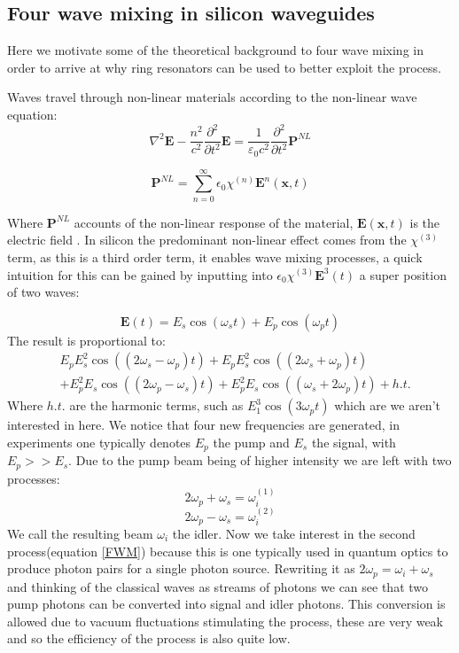 \subsection{Four wave mixing in silicon waveguides}
Here we motivate some of the theoretical background to four wave mixing in order to arrive at why ring resonators can be used to better exploit the process. 

Waves travel through non-linear materials according to the non-linear wave equation:
\begin{equation}
\nabla^2 \mathbf{E} - \frac{n^2}{c^2}\frac{\partial^2}{\partial t^2}\mathbf{E}
= \frac{1}{\varepsilon_0 c^2}\frac{\partial^2}{\partial t^2}\mathbf{P}^{NL}
\end{equation}

\begin{equation} \label{polEqn}
\mathbf{P}^{NL} =\sum^\infty_{n=0} \epsilon_0\chi^{(n)}\mathbf{E}^n(\mathbf{x	},t)
\end{equation}

Where $\mathbf{P}^{NL}$ accounts of the non-linear response of the material, $\mathbf{E}(\mathbf{x},t)$ is the electric field . In silicon the predominant non-linear effect comes from the $\chi^{(3)}$ term, as this is a third order term, it enables wave mixing processes, a quick intuition for this can be gained by inputting into $ \epsilon_0\chi^{(3)}\mathbf{E}^3(t)$ a super position of two waves:


\begin{equation}
\mathbf{E}(t)=E_s\cos(\omega_st)+E_p\cos(\omega_pt)
\end{equation}
\noindent
The result is proportional to:
\begin{align}
&E_p E_s^2 \cos ((2 {\omega_s}-{\omega_p})t)+E_p E_s^2 \cos ((2 {\omega_s}+{\omega_p})t)\\
&+ E_p^2 E_s \cos ((2{\omega_p}-{\omega_s})t)+ E_p^2 E_s \cos (({\omega_s}+2 \omega_p)t) + h.t.
\end{align}
\noindent
Where $h.t.$ are the harmonic terms, such as $E_1^3\cos(3\omega_p t)$ which are we aren't interested in here. We notice that four new frequencies are generated, in experiments one typically denotes $E_p$ the pump and $E_s$ the signal, with $E_p >> E_s$. Due to the pump beam being of higher intensity we are left with two processes:
\begin{equation}
	2\omega_p+\omega_s = \omega_i^{(1)}
\end{equation}
\begin{equation} \label{FWM}
	2\omega_p-\omega_s = \omega_i^{(2)}
\end{equation}
We call the resulting beam $\omega_i$ the idler. Now we take interest in the second process(equation \ref{FWM}) because this is one typically used in quantum optics to produce photon pairs for a single photon source. Rewriting it as $	2\omega_p = \omega_i+\omega_s$ and thinking of the classical waves as streams of photons we can see that two pump photons can be converted into signal and idler photons. This conversion is allowed due to vacuum fluctuations stimulating the process, these are very weak and so the efficiency of the process is also quite low.

